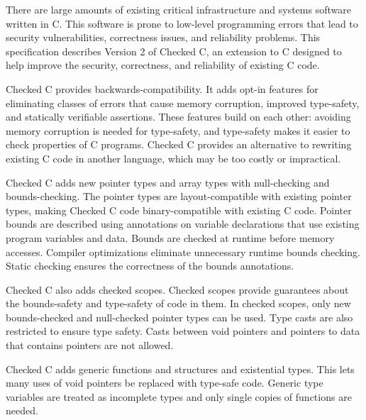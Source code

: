 
\parbox{6.0in}{
There are large amounts of existing critical infrastructure and
systems software written in C. This software is prone to
low-level programming errors that lead to security vulnerabilities,
correctness issues, and reliability problems.  This specification describes
Version 2 of Checked C, an extension to C designed to help improve the security,
correctness, and reliability of existing C code.
}

\vspace{11pt}

\parbox{6.0in}{Checked C provides backwards-compatibility.
It adds opt-in features for eliminating classes of errors that
cause memory corruption, improved type-safety, and  statically verifiable
assertions.
These features build on each other: avoiding memory corruption
is needed for type-safety, and type-safety makes it easier
to check properties of C programs.
Checked C provides an alternative to rewriting existing C code in another
language, which may be too costly or impractical.}

\vspace{11pt}

\parbox{6.0in}{Checked C adds new pointer types and array types
with null-checking and bounds-checking.  
The pointer types
are layout-compatible with existing pointer
types, making Checked C code binary-compatible with existing C code.
Pointer bounds are described using annotations on variable
declarations that use existing program variables and data.
Bounds are checked at runtime before memory accesses.
Compiler optimizations eliminate unnecessary runtime bounds checking.
Static checking ensures the correctness of the bounds annotations.}

\vspace{11pt}

\parbox{6.0in}{Checked C also adds checked scopes. Checked scopes
provide guarantees about the bounds-safety and type-safety of code
in them. In checked
scopes, only new bounds-checked and null-checked pointer types
can be used.  Type casts are also restricted to ensure type
safety.  Casts between void pointers and pointers to
 data that contains pointers are not allowed.}

\vspace{11pt}

\parbox{6.0in}{Checked C adds generic functions and structures
and existential types. This lets many uses of void pointers be replaced
with type-safe code. Generic type variables are treated as incomplete
types and only single copies of functions are needed.}
